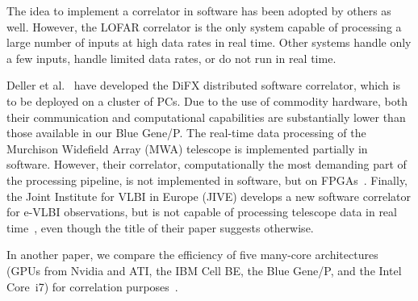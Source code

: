 \documentclass{sig-alternate}
\begin{document}
The idea to implement a correlator in software has been adopted by others as
well.
However, the LOFAR correlator is the only system capable of processing a large
number of inputs at high data rates in real time.
Other systems handle only a few inputs, handle limited data rates, or do not
run in real time.

Deller et al.~\cite{Deller:07} have developed the DiFX distributed
software correlator, which is to be deployed on a cluster of PCs.
Due to the use of commodity hardware, both their communication and
computational capabilities are substantially lower than those available in
our Blue Gene/P.
The real-time data processing of the Murchison Widefield Array (MWA) telescope
is implemented partially in software.
However, their correlator, computationally the most demanding part of the
processing pipeline, is not implemented in software, but on 
FPGAs~\cite{Ord:08}.
Finally, the Joint Institute for VLBI in Europe (JIVE) develops a new software
correlator for e-VLBI observations, but is not capable of processing telescope
data in real time~\cite{Kruithof:08}, even though the title of their paper suggests
otherwise.

In another paper, we compare the efficiency of five many-core
architectures (GPUs from Nvidia and ATI, the IBM Cell BE, the Blue Gene/P,
and the Intel Core~i7) for correlation purposes~\cite{Nieuwpoort:09}.


\end{document}
